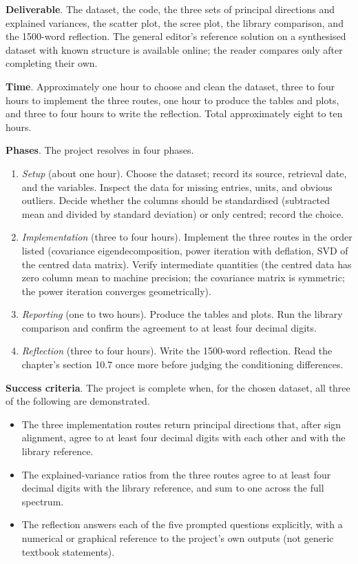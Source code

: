 \begin{project}
\textbf{Deliverable}. The dataset, the code, the three sets of
principal directions and explained variances, the scatter plot, the
scree plot, the library comparison, and the 1500-word reflection.
The general editor's reference solution on a synthesised dataset
with known structure is available online; the reader compares only
after completing their own.

\textbf{Time}. Approximately one hour to choose and clean the
dataset, three to four hours to implement the three routes, one
hour to produce the tables and plots, and three to four hours to
write the reflection. Total approximately eight to ten hours.

\textbf{Phases}. The project resolves in four phases.

\begin{enumerate}[leftmargin=*]
  \item \textit{Setup} (about one hour). Choose the dataset; record
    its source, retrieval date, and the variables. Inspect the data
    for missing entries, units, and obvious outliers. Decide whether
    the columns should be standardised (subtracted mean and divided
    by standard deviation) or only centred; record the choice.
  \item \textit{Implementation} (three to four hours). Implement the
    three routes in the order listed (covariance eigendecomposition,
    power iteration with deflation, SVD of the centred data
    matrix). Verify intermediate quantities (the centred data has
    zero column mean to machine precision; the covariance matrix is
    symmetric; the power iteration converges geometrically).
  \item \textit{Reporting} (one to two hours). Produce the tables
    and plots. Run the library comparison and confirm the agreement
    to at least four decimal digits.
  \item \textit{Reflection} (three to four hours). Write the
    1500-word reflection. Read the chapter's section 10.7 once more
    before judging the conditioning differences.
\end{enumerate}

\textbf{Success criteria}. The project is complete when, for the
chosen dataset, all three of the following are demonstrated.

\begin{itemize}[leftmargin=*]
  \item The three implementation routes return principal directions
    that, after sign alignment, agree to at least four decimal
    digits with each other and with the library reference.
  \item The explained-variance ratios from the three routes agree
    to at least four decimal digits with the library reference, and
    sum to one across the full spectrum.
  \item The reflection answers each of the five prompted questions
    explicitly, with a numerical or graphical reference to the
    project's own outputs (not generic textbook statements).
\end{itemize}


\end{project}
